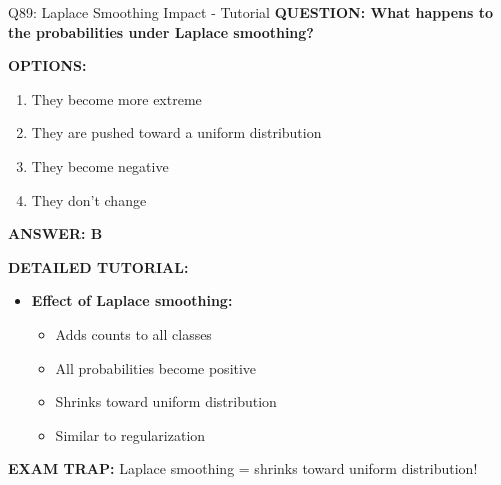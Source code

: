 \documentclass[8pt]{beamer}
\begin{document}
	\begin{frame}{Q89: Laplace Smoothing Impact - Tutorial}
		\fontsize{6.5}{7.5}\selectfont
		\textbf{QUESTION: What happens to the probabilities under Laplace smoothing?}
		
		\vspace{0.1cm}
		\textbf{OPTIONS:}
		\begin{enumerate}
			\item They become more extreme
			\item They are pushed toward a uniform distribution
			\item They become negative
			\item They don't change
		\end{enumerate}
		
		\vspace{0.1cm}
		\textcolor{myblue}{\textbf{ANSWER: B}}
		
		\vspace{0.1cm}
		\textbf{DETAILED TUTORIAL:}
		\begin{itemize}
			\item \textbf{Effect of Laplace smoothing:}
			\begin{itemize}
				\item Adds counts to all classes
				\item All probabilities become positive
				\item Shrinks toward uniform distribution
				\item Similar to regularization
			\end{itemize}
		\end{itemize}
		
		\textcolor{myred}{\textbf{EXAM TRAP:}} Laplace smoothing = \textcolor{myblue}{shrinks toward uniform distribution}!
	\end{frame}
	
\end{document}
